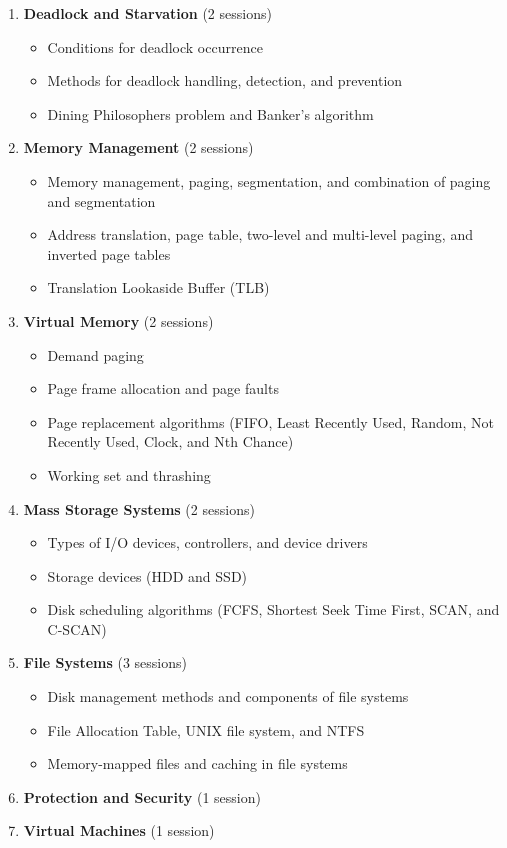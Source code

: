 \documentclass[12pt]{article}
\begin{document}
\begin{enumerate}
    \item \textbf{Deadlock and Starvation} (2 sessions)
    \begin{itemize}
        \item Conditions for deadlock occurrence
        \item Methods for deadlock handling, detection, and prevention
        \item Dining Philosophers problem and Banker's algorithm
    \end{itemize}

    \item \textbf{Memory Management} (2 sessions)
    \begin{itemize}
        \item Memory management, paging, segmentation, and combination of paging and segmentation
        \item Address translation, page table, two-level and multi-level paging, and inverted page tables
        \item Translation Lookaside Buffer (TLB)
    \end{itemize}

    \item \textbf{Virtual Memory} (2 sessions)
    \begin{itemize}
        \item Demand paging
        \item Page frame allocation and page faults
        \item Page replacement algorithms (FIFO, Least Recently Used, Random, Not Recently Used, Clock, and Nth Chance)
        \item Working set and thrashing
    \end{itemize}

    \item \textbf{Mass Storage Systems} (2 sessions)
    \begin{itemize}
        \item Types of I/O devices, controllers, and device drivers
        \item Storage devices (HDD and SSD)
        \item Disk scheduling algorithms (FCFS, Shortest Seek Time First, SCAN, and C-SCAN)
    \end{itemize}

    \item \textbf{File Systems} (3 sessions)
    \begin{itemize}
        \item Disk management methods and components of file systems
        \item File Allocation Table, UNIX file system, and NTFS
        \item Memory-mapped files and caching in file systems
    \end{itemize}

    \item \textbf{Protection and Security} (1 session)
    \item \textbf{Virtual Machines} (1 session)
\end{enumerate}
\end{document}
